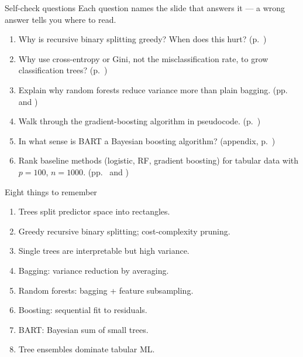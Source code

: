 \documentclass[aspectratio=169,11pt]{beamer}
\begin{document}
\begin{frame}{Self-check questions}
  Each question names the slide that answers it --- a wrong answer tells you
  where to read.
  \begin{enumerate}
    \item Why is recursive binary splitting greedy? When does this
          hurt? (p.~\pageref{frm:greedy})
    \item Why use cross-entropy or Gini, not the misclassification
          rate, to grow classification trees? (p.~\pageref{frm:gini})
    \item Explain why random forests reduce variance more than plain
          bagging. (pp.~\pageref{frm:avggain} and \pageref{frm:rf})
    \item Walk through the gradient-boosting algorithm in pseudocode.
          (p.~\pageref{frm:boost})
    \item In what sense is BART a Bayesian boosting algorithm?
          (appendix, p.~\pageref{frm:bart})
    \item Rank baseline methods (logistic, RF, gradient boosting) for
          tabular data with $p = 100$, $n = 1000$. (pp.~\pageref{frm:headtohead} and \pageref{frm:rules})
  \end{enumerate}
\end{frame}

\begin{frame}{Eight things to remember}
  \begin{enumerate}
    \item Trees split predictor space into rectangles.
    \item Greedy recursive binary splitting; cost-complexity pruning.
    \item Single trees are interpretable but high variance.
    \item Bagging: variance reduction by averaging.
    \item Random forests: bagging + feature subsampling.
    \item Boosting: sequential fit to residuals.
    \item BART: Bayesian sum of small trees.
    \item Tree ensembles dominate tabular ML.
  \end{enumerate}
\end{frame}
\end{document}
